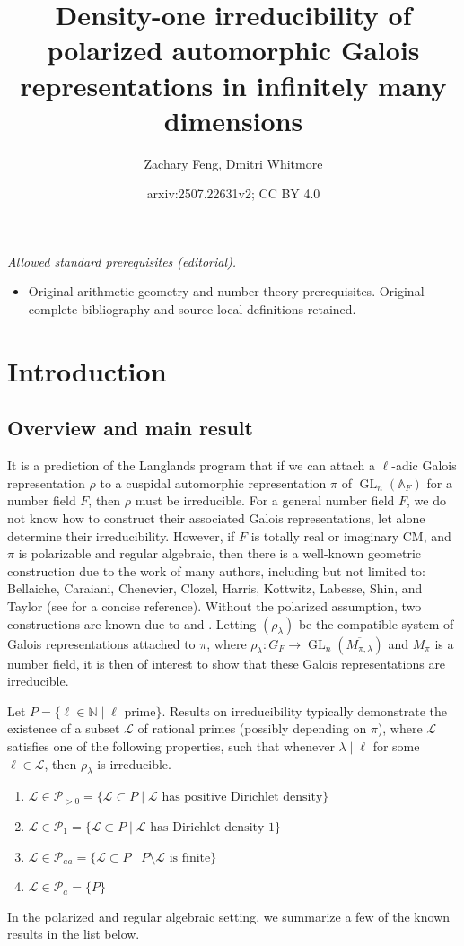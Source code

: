 \documentclass{amsart}
\title{Density-one irreducibility of polarized automorphic Galois representations in infinitely many dimensions}
\author{Zachary Feng, Dmitri Whitmore}
\date{arxiv:2507.22631v2; CC BY 4.0}
\theoremstyle{definition}
\numberwithin{equation}{section} %
\newcommand{\GL}{\operatorname{GL}}
\newcommand{\bb}[1]{\mathbb{#1}}
\newcommand{\mc}[1]{\mathcal{#1}}
\newcommand{\ol}[1]{\overline{#1}}
\begin{document}
\maketitle
\noindent\textit{Allowed standard prerequisites (editorial).}\begin{itemize}
\item Original arithmetic geometry and number theory prerequisites. Original complete bibliography and source-local definitions retained.
\end{itemize}\medskip
\section{Introduction}

\subsection{Overview and main result}

It is a prediction of the Langlands program that if we can attach a \(\ell\)-adic Galois representation $\rho$ to a cuspidal automorphic representation \( \pi \) of \( \GL_n(\bb{A}_F) \) for a number field \( F \), then $\rho$ must be irreducible. For a general number field \( F \), we do not know how to construct their associated Galois representations, let alone determine their irreducibility. However, if \( F \) is totally real or imaginary CM, and \( \pi \) is polarizable and regular algebraic, then there is a well-known geometric construction due to the work of many authors, including but not limited to: Bellaiche, Caraiani, Chenevier, Clozel, Harris, Kottwitz, Labesse, Shin, and Taylor (see \cite[Theorem 2.1.1]{BLGGT14} for a concise reference). Without the polarized assumption, two constructions are known due to \cite{HLTT16} and \cite{Scholz15}.
Letting \( (\rho_\lambda) \) be the compatible system of Galois representations attached to \( \pi \), where \( \rho_\lambda:G_F\to\GL_n(\ol{M_{\pi,\lambda}}) \) and \( M_\pi \) is a number field, it is then of interest to show that these Galois representations are irreducible. 

Let \( P = \{\ell\in\bb{N}\mid\ell\text{ prime} \} \). Results on irreducibility typically demonstrate the existence of a subset \( \mc{L} \) of rational primes (possibly depending on $\pi$), where \( \mc{L} \) satisfies one of the following properties, such that whenever \( \lambda\mid\ell\) for some \(\ell\in\mc{L} \), then \( \rho_\lambda \) is irreducible.
\begin{enumerate}
    \item \( \mc{L}\in\mc{P}_{>0} = \{ \mc{L}\subset P \mid \mc{L} \text{ has positive Dirichlet density} \} \)
    \item \( \mc{L}\in\mc{P}_{1} = \{ \mc{L}\subset P\mid \mc{L}\text{ has Dirichlet density }1 \} \)
    \item \( \mc{L}\in\mc{P}_{aa} = \{ \mc{L}\subset P\mid P\setminus\mc{L} \text{ is finite} \} \)
    \item \( \mc{L}\in\mc{P}_{a} = \{ P \} \)
\end{enumerate}
In the polarized and regular algebraic setting, we summarize a few of the known results in the list below.
\end{document}
